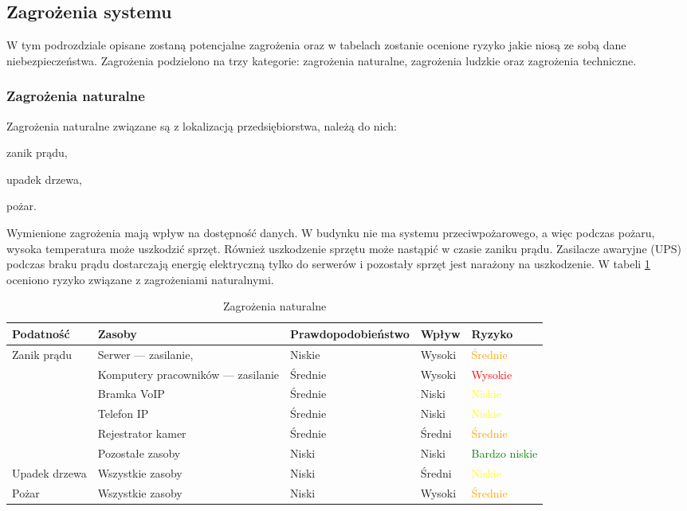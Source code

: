 \subsection{Zagrożenia systemu}
W tym podrozdziale opisane zostaną potencjalne zagrożenia oraz w tabelach zostanie ocenione ryzyko jakie niosą ze sobą dane niebezpieczeństwa. Zagrożenia podzielono na trzy kategorie: zagrożenia naturalne, zagrożenia ludzkie oraz zagrożenia techniczne.

\subsubsection{Zagrożenia naturalne} 
Zagrożenia naturalne związane są z lokalizacją przedsiębiorstwa, należą do nich:
\begin{itemize*}
	\item zanik prądu,
	\item upadek drzewa,
	\item pożar.
\end{itemize*}

Wymienione zagrożenia mają wpływ na dostępność danych. W budynku nie ma systemu przeciwpożarowego, a więc podczas pożaru, wysoka temperatura może uszkodzić sprzęt. Również uszkodzenie sprzętu może nastąpić w czasie zaniku prądu. Zasilacze awaryjne (UPS) podczas braku prądu dostarczają energię elektryczną tylko do serwerów i pozostały sprzęt jest narażony na uszkodzenie. W tabeli \ref{zagrożeniaN_natalne} oceniono ryzyko związane z zagrożeniami naturalnymi.

\begin{landscape}
\begin{longtable}[ht!]{|m{4cm}|m{6cm}|m{4.5cm}|m{3cm}|m{3cm}|}
	\caption{Zagrożenia naturalne}
	\label{zagrożeniaN_natalne} \\
		\hline	
		\textbf{Podatność} & \textbf{Zasoby} & \textbf{Prawdopodobieństwo} & \textbf{Wpływ} &  \textbf{Ryzyko} \\ \hline
	\multirow{5}{4cm}{Zanik prądu}  
		&   Serwer --- zasilanie,  & Niskie & Wysoki & \textcolor{orange}{Średnie}  \\ \cline{2-5}
		& Komputery pracowników --- zasilanie & Średnie & Wysoki & \textcolor{red}{Wysokie} \\ \cline{2-5}
		& Bramka VoIP & Średnie & Niski & \textcolor{yellow}{Niskie} \\ \cline{2-5}
		& Telefon IP & Średnie & Niski & \textcolor{yellow}{Niskie} \\ \cline{2-5}
		& Rejestrator kamer & Średnie & Średni & \textcolor{orange}{Średnie} \\ \cline{2-5}
		& Pozostałe zasoby & Niski & Niski & \textcolor{green}{Bardzo niskie} \\ \cline{2-5}
	\hline
	Upadek drzewa  
		& Wszystkie zasoby & Niski  & Średni & \textcolor{yellow}{Niskie} \\ \cline{2-5}
	\hline
	Pożar
		& Wszystkie zasoby & Niski  & Wysoki & \textcolor{orange}{Średnie} \\ \cline{2-5}
	\hline
\end{longtable}
\end{landscape}

